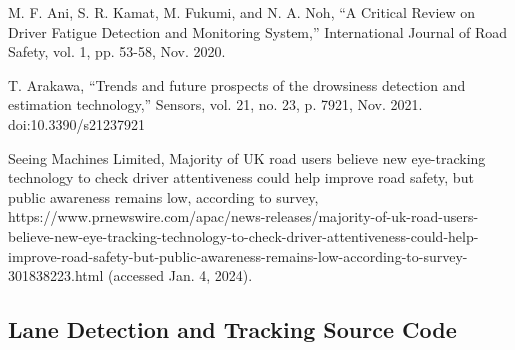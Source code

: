\documentclass[10pt,conference]{IEEEtran}
\begin{document}
\begin{thebibliography}{00}
     M. F. Ani, S. R. Kamat, M. Fukumi, and N. A. Noh, “A Critical Review on Driver Fatigue Detection and Monitoring System,” International Journal of Road Safety, vol. 1, pp. 53-58, Nov. 2020.

     T. Arakawa, “Trends and future prospects of the drowsiness detection and estimation technology,” Sensors, vol. 21, no. 23, p. 7921, Nov. 2021. doi:10.3390/s21237921

     Seeing Machines Limited, Majority of UK road users believe new eye-tracking technology to check driver attentiveness could help improve road safety, but public awareness remains low, according to survey, https://www.prnewswire.com/apac/news-releases/majority-of-uk-road-users-believe-new-eye-tracking-technology-to-check-driver-attentiveness-could-help-improve-road-safety-but-public-awareness-remains-low-according-to-survey-301838223.html (accessed Jan. 4, 2024).

\end{thebibliography}

\appendix

\subsection{Lane Detection and Tracking Source Code}
\label{a1}
\end{document}
